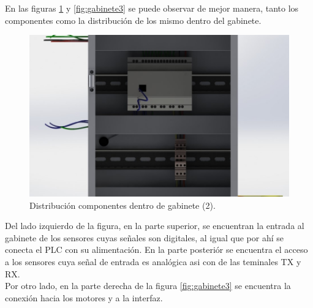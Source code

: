 En las figuras \ref{fig:gabinete2} y \ref{fig:gabinete3} se puede observar de mejor manera, tanto los componentes como la distribución de los mismo dentro del gabinete.

\begin{figure}[H]
	\centering
	\includegraphics[scale=0.5]{imagenes/gabinete2.jpg}
	\caption{Distribución componentes dentro de gabinete (2).}
	\label{fig:gabinete2}
\end{figure}

Del lado izquierdo de la figura, en la parte superior, se encuentran la entrada al gabinete de los sensores cuyas señales son digitales, al igual que por ahí se conecta el PLC con su alimentación. En la parte posteriór se encuentra el acceso a los sensores cuya señal de entrada es analógica asi con de las teminales TX y RX.  \\

Por otro lado, en la parte derecha de la figura \ref{fig:gabinete3} se encuentra la conexión hacia los motores y a la interfaz. 


